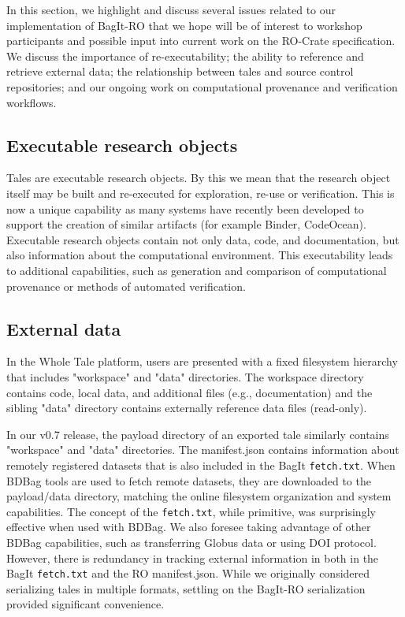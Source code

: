 \documentclass[conference]{IEEEtran}
\begin{document}
In this section, we highlight and discuss several issues related to our implementation of BagIt-RO that we hope will be of interest to workshop participants and possible input into current work on the RO-Crate specification. We discuss the importance of re-executability; the ability to reference and retrieve external data; the relationship between tales and source control repositories; and our ongoing work on computational provenance and verification workflows.

\subsection{Executable research objects}
Tales are executable research objects. By this we mean that the research object itself may be built and re-executed for exploration, re-use or verification. This is now a unique capability as many systems have recently been developed to support the creation of similar artifacts (for example Binder, CodeOcean).  Executable research objects contain not only data, code, and documentation, but also information about the computational environment. This executability leads to additional capabilities, such as generation and comparison of computational provenance or methods of automated verification.

\subsection{External data}
In the Whole Tale platform, users are presented with a fixed filesystem hierarchy that includes  
"workspace" and "data" directories. The workspace directory contains code, local data, and 
additional files (e.g., documentation) and the sibling "data" directory contains externally 
reference data files (read-only).

In our v0.7 release, the payload directory of an exported tale similarly contains "workspace" and 
"data" directories. The manifest.json contains information about remotely registered datasets that 
is also included in the BagIt \texttt{fetch.txt}.  When BDBag tools are used to fetch remote datasets, they 
are downloaded to the payload/data directory, matching the online filesystem organization and 
system capabilities.  The concept of the \texttt{fetch.txt}, while primitive, was surprisingly effective 
when used with BDBag. We also foresee taking advantage of other BDBag capabilities, such as 
transferring Globus data or using DOI protocol. However, there is redundancy in tracking external 
information in both in the BagIt \texttt{fetch.txt} and the RO manifest.json. While we originally 
considered serializing tales in multiple formats, settling on the BagIt-RO serialization provided 
significant convenience.
\end{document}
